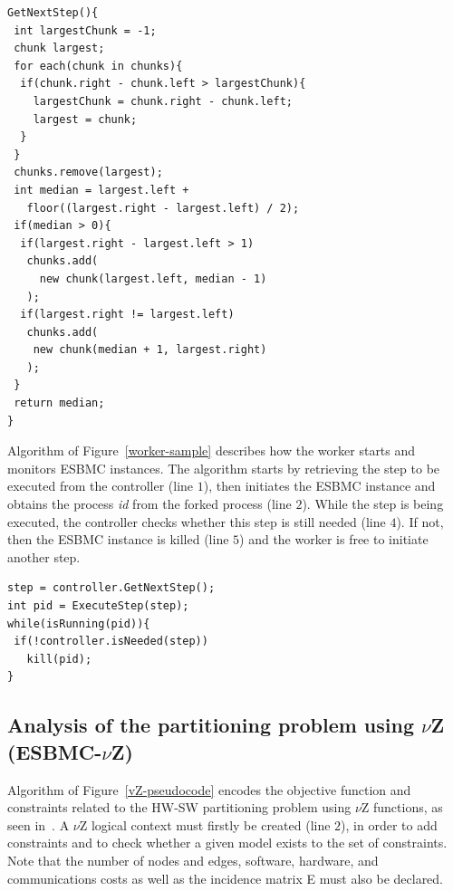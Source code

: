 \documentclass{doublecol-new}
\theoremstyle{TH}{
\newtheorem{lemma}{Lemma}
\newtheorem{theorem}[lemma]{Theorem}
\newtheorem{corrolary}[lemma]{Corrolary}
\newtheorem{conjecture}[lemma]{Conjecture}
\newtheorem{proposition}[lemma]{Proposition}
\newtheorem{claim}[lemma]{Claim}
\newtheorem{stheorem}[lemma]{Wrong Theorem}
\newtheorem{algorithm}{Algorithm}
}
\theoremstyle{THrm}{
\newtheorem{definition}{Definition}[section]
\newtheorem{question}{Question}[section]
\newtheorem{remark}{Remark}
\newtheorem{scheme}{Scheme}
}
\theoremstyle{THhit}{
\newtheorem{case}{Case}[section]
}
\begin{document}
\vspace{-1.5 mm}
\begin{lstlisting}[basicstyle=\footnotesize,caption={Steps calculation using intervals.},label={Steps-Calculation-using-Intervals},numbersep=7pt,frame=tb,captionpos=t,numberstyle=\tiny]
GetNextStep(){
 int largestChunk = -1;
 chunk largest;
 for each(chunk in chunks){
  if(chunk.right - chunk.left > largestChunk){
    largestChunk = chunk.right - chunk.left;
    largest = chunk;
  }
 }	
 chunks.remove(largest);	
 int median = largest.left + 
   floor((largest.right - largest.left) / 2);
 if(median > 0){
  if(largest.right - largest.left > 1)
   chunks.add(
     new chunk(largest.left, median - 1)
   );	
  if(largest.right != largest.left)
   chunks.add(
    new chunk(median + 1, largest.right)
   );
 }
 return median;
}
\end{lstlisting}

\vspace {-1.5 mm}
Algorithm of Figure~\ref{worker-sample} describes how the worker starts and monitors ESBMC instances. The algorithm starts by retrieving the step to be executed from the controller (line $1$), then initiates the ESBMC instance and obtains the process \textit{id} from the forked process (line $2$). While the step is being executed, the controller checks whether this step is still needed (line $4$). If not, then the ESBMC instance is killed (line $5$) and the worker is free to initiate another step.

\begin{lstlisting}[basicstyle=\footnotesize,caption={Worker sample.},label={worker-sample},numbersep=7pt,frame=tb,captionpos=t,numberstyle=\tiny]
step = controller.GetNextStep();
int pid = ExecuteStep(step);
while(isRunning(pid)){
 if(!controller.isNeeded(step))
   kill(pid);
}
\end{lstlisting}

\subsection{Analysis of the partitioning problem using $\nu$Z (ESBMC-$\nu$Z)}
\label{Analysis-of-the-partitioning-problem-using-vZ}

Algorithm of Figure~\ref{vZ-pseudocode} encodes the objective function and constraints related to the HW-SW partitioning problem using $\nu$Z functions, as seen in~\cite{Bjorner2014}. A $\nu$Z logical context must firstly be created (line $2$), in order to add constraints and to check whether a given model exists to the set of constraints. Note that the number of nodes and edges, software, hardware, and communications costs as well as the incidence matrix E must also be declared.
\end{document}
